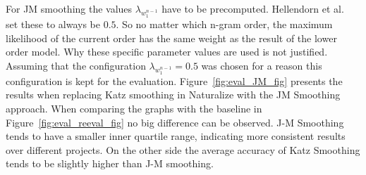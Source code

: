 For JM smoothing the values $\lambda_{w_1^{n-1}}$ have to be precomputed. Hellendorn et al.~\cite{nestedngram} set these to always be $0.5$. So no matter which n-gram order, the maximum likelihood of the current order has the same weight as the result of the lower order model. Why these specific parameter values are used is not justified. Assuming that the configuration $\lambda_{w_1^{n-1}}=0.5$ was chosen for a reason this configuration is kept for the evaluation. Figure~\ref{fig:eval_JM_fig} presents the results when replacing Katz smoothing in Naturalize with the JM Smoothing approach. When comparing the graphs with the baseline in Figure~\ref{fig:eval_reeval_fig} no big difference can be observed. J-M Smoothing tends to have a smaller inner quartile range, indicating more consistent results over different projects. On the other side the average accuracy of Katz Smoothing tends to be slightly higher than J-M smoothing.
\noindent{}